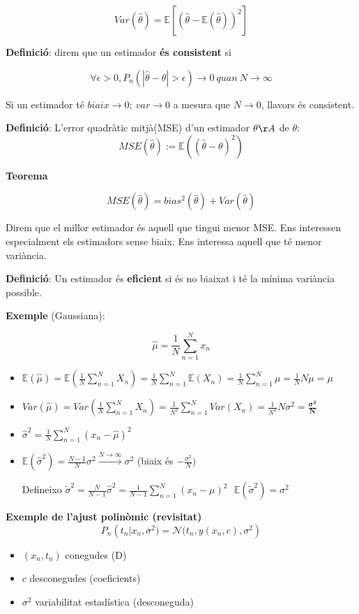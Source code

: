 \documentclass[a4paper]{article}
\begin{document}
\[ Var(\hat{\theta}) = \mathbb{E}\left[(\hat{\theta} - \mathbb{E}(\hat{\theta}))^2\right] \]

\textbf{Definició}: direm que un estimador \textbf{és consistent} si

\[ \forall\epsilon>0, P_n(|\hat{\theta} - \theta| > \epsilon) \rightarrow 0\ quan\ N \rightarrow \infty \]

Si un estimador té $biaix \rightarrow 0;\ var\rightarrow0$ a mesura que $N\rightarrow0$, llavors és consistent.

\textbf{Definició}: L'error quadràtic mitjà(MSE) d'un estimador $\theta\AA$ de $\theta$:
\[MSE(\hat{\theta}) := \mathbb{E}\left((\hat{\theta}-\theta)^2\right)\]

\textbf{Teorema}

\[MSE(\hat{\theta}) = bias^2(\hat{\theta}) + Var(\hat{\theta})\]


Direm que el millor estimador és aquell que tingui menor MSE. Ens interessen especialment els estimadors sense biaix. Ens interessa aquell que té menor variància. 

\textbf{Definició}: Un estimador és \textbf{eficient} si és no biaixat i té la mínima variància possible.

\textbf{Exemple} (Gaussiana):

\[ \boxed{\hat{\mu}=\frac{1}{N}\sum_{n=1}^N x_n} \]

\begin{itemize}
	\item $\mathbb{E}(\hat{\mu}) = \mathbb{E}\left(\frac{1}{N}\sum_{n=1}^N X_n\right)=\frac{1}{N}\sum_{n=1}^N \mathbb{E}(X_n) = \frac{1}{N}\sum_{n=1}^N \mu = \frac{1}{N}N\mu = \mu$
	
	\item $Var(\hat{\mu}) = Var\left(\frac{1}{N}\sum_{n=1}^N X_n\right) = \frac{1}{N^2}\sum_{n=1}^N Var(X_n) = \frac{1}{N^2}N\sigma^2 = \boxed{ \boldsymbol{\frac{\sigma^2}{N}}}$
	
	\item $\hat{\sigma}^2 = \frac{1}{N}\sum_{n=1}^N(x_n-\hat{\mu})^2$
	
	\item $\mathbb{E}(\hat{\sigma}^2) = \frac{N-1}{N}\sigma^2 \xrightarrow{N\rightarrow\infty} \sigma^2$ (biaix és $-\frac{\sigma^2}{N})$
	
	Defineixo $\tilde{\sigma}^2 = \frac{N}{N-1}\hat{\sigma}^2 = \frac{1}{N-1}\sum_{n=1}^N(x_n - \mu)^2 \ \ \  \mathbb{E}(\tilde{\sigma}^2) = \sigma^2$
\end{itemize}


\textbf{Exemple de l'ajust polinòmic (revisitat)}
\[P_n\left(t_n|x_n, \sigma^2)=\mathcal{N}(t_n, y(x_n, c), \sigma^2\right)\]

\begin{itemize}
	\item $(x_n, t_n)$ conegudes (D)
	\item $c$ desconegudes (coeficients)
	\item $\sigma^2$ variabilitat estadística (desconeguda)
\end{itemize}
\end{document}
